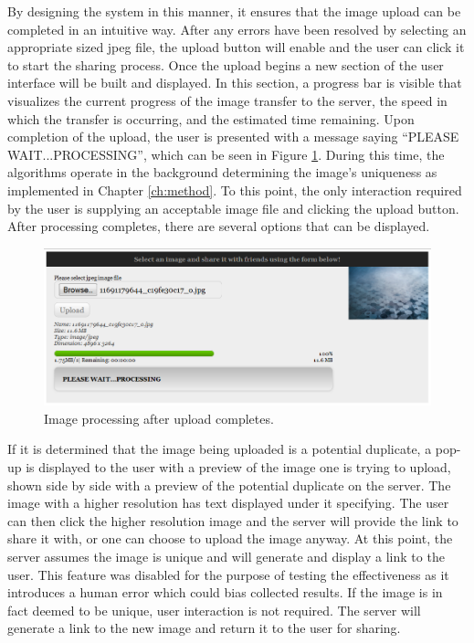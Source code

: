 By designing the system in this manner, it ensures that the image upload can be completed in an intuitive way. After any errors have been resolved by selecting an appropriate sized jpeg file, the upload button will enable and the user can click it to start the sharing process. Once the upload begins a new section of the user interface will be built and displayed. In this section, a progress bar is visible that visualizes the current progress of the image transfer to the server, the speed in which the transfer is occurring, and the estimated time remaining. Upon completion of the upload, the user is presented with a message saying ``PLEASE WAIT...PROCESSING'', which can be seen in Figure \ref{fig:imageprocessing}. During this time, the algorithms operate in the background determining the image's uniqueness as implemented in Chapter \ref{ch:method}. To this point, the only interaction required by the user is supplying an acceptable image file and clicking the upload button. After processing completes, there are several options that can be displayed.

\begin{figure}[htbp]
\centering
\includegraphics[width=6in]{imageprocessing}
\caption{Image processing after upload completes.}
\label{fig:imageprocessing}
\end{figure}

If it is determined that the image being uploaded is a potential duplicate, a pop-up is displayed to the user with a preview of the image one is trying to upload, shown side by side with a preview of the potential duplicate on the server. The image with a higher resolution has text displayed under it specifying. The user can then click the higher resolution image and the server will provide the link to share it with, or one can choose to upload the image anyway. At this point, the server assumes the image is unique and will generate and display a link to the user. This feature was disabled for the purpose of testing the effectiveness as it introduces a human error which could bias collected results. If the image is in fact deemed to be unique, user interaction is not required. The server will generate a link to the new image and return it to the user for sharing.

